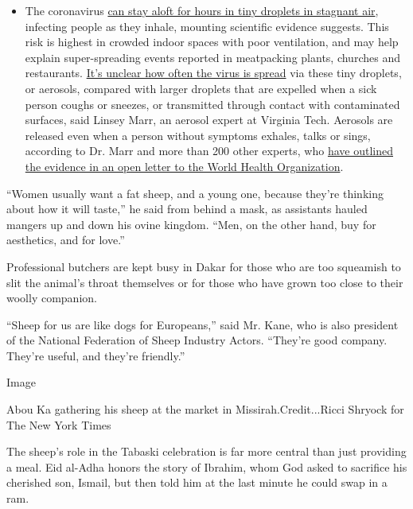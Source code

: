 \begin{itemize}
  \begin{itemize}
  \tightlist
  \item
    The coronavirus
    \href{https://www.nytimes.com/2020/07/04/health/239-experts-with-one-big-claim-the-coronavirus-is-airborne.html?action=click\&pgtype=Article\&state=default\&region=MAIN_CONTENT_3\&context=storylines_faq}{can
    stay aloft for hours in tiny droplets in stagnant air}, infecting
    people as they inhale, mounting scientific evidence suggests. This
    risk is highest in crowded indoor spaces with poor ventilation, and
    may help explain super-spreading events reported in meatpacking
    plants, churches and restaurants.
    \href{https://www.nytimes.com/2020/07/06/health/coronavirus-airborne-aerosols.html?action=click\&pgtype=Article\&state=default\&region=MAIN_CONTENT_3\&context=storylines_faq}{It's
    unclear how often the virus is spread} via these tiny droplets, or
    aerosols, compared with larger droplets that are expelled when a
    sick person coughs or sneezes, or transmitted through contact with
    contaminated surfaces, said Linsey Marr, an aerosol expert at
    Virginia Tech. Aerosols are released even when a person without
    symptoms exhales, talks or sings, according to Dr. Marr and more
    than 200 other experts, who
    \href{https://academic.oup.com/cid/article/doi/10.1093/cid/ciaa939/5867798}{have
    outlined the evidence in an open letter to the World Health
    Organization}.
  \end{itemize}
\end{itemize}

``Women usually want a fat sheep, and a young one, because they're
thinking about how it will taste,'' he said from behind a mask, as
assistants hauled mangers up and down his ovine kingdom. ``Men, on the
other hand, buy for aesthetics, and for love.''

Professional butchers are kept busy in Dakar for those who are too
squeamish to slit the animal's throat themselves or for those who have
grown too close to their woolly companion.

``Sheep for us are like dogs for Europeans,'' said Mr. Kane, who is also
president of the National Federation of Sheep Industry Actors. ``They're
good company. They're useful, and they're friendly.''

Image

Abou Ka gathering his sheep at the market in Missirah.Credit...Ricci
Shryock for The New York Times

The sheep's role in the Tabaski celebration is far more central than
just providing a meal. Eid al-Adha honors the story of Ibrahim, whom God
asked to sacrifice his cherished son, Ismail, but then told him at the
last minute he could swap in a ram.

